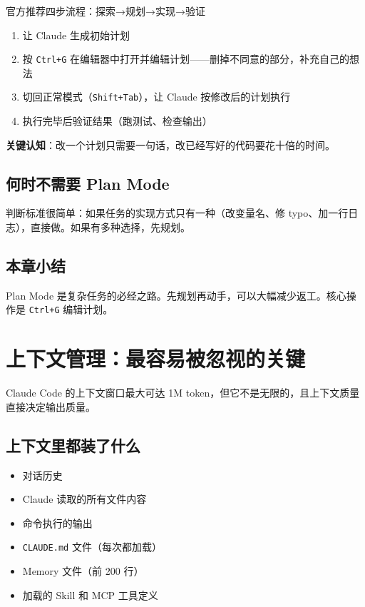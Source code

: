 \documentclass[a4paper]{article}
\begin{document}
\begin{importantbox}{官方推荐四步流程：探索→规划→实现→验证}
\begin{enumerate}[leftmargin=1.5em]
  \item 让 Claude 生成初始计划
  \item 按 \texttt{Ctrl+G} 在编辑器中打开并编辑计划——删掉不同意的部分，补充自己的想法
  \item 切回正常模式（\texttt{Shift+Tab}），让 Claude 按修改后的计划执行
  \item 执行完毕后验证结果（跑测试、检查输出）
\end{enumerate}
\textbf{关键认知}：改一个计划只需要一句话，改已经写好的代码要花十倍的时间。
\end{importantbox}

\subsection{何时不需要 Plan Mode}

判断标准很简单：如果任务的实现方式只有一种（改变量名、修 typo、加一行日志），直接做。如果有多种选择，先规划。

\subsection{本章小结}

Plan Mode 是复杂任务的必经之路。先规划再动手，可以大幅减少返工。核心操作是 \texttt{Ctrl+G} 编辑计划。

\section{上下文管理：最容易被忽视的关键}

Claude Code 的上下文窗口最大可达 1M token，但它不是无限的，且上下文质量直接决定输出质量。

\subsection{上下文里都装了什么}

\begin{itemize}[leftmargin=1.5em]
  \item 对话历史
  \item Claude 读取的所有文件内容
  \item 命令执行的输出
  \item \texttt{CLAUDE.md} 文件（每次都加载）
  \item Memory 文件（前 200 行）
  \item 加载的 Skill 和 MCP 工具定义
\end{itemize}
\end{document}
